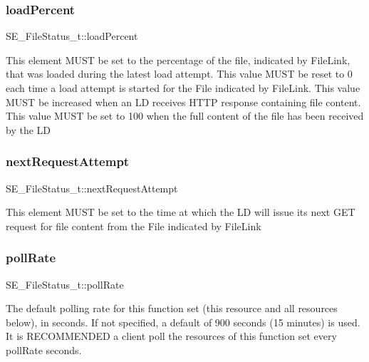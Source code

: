 \subsubsection{\texorpdfstring{load\+Percent}{loadPercent}}
{\footnotesize\ttfamily S\+E\+\_\+\+File\+Status\+\_\+t\+::load\+Percent}

This element M\+U\+ST be set to the percentage of the file, indicated by File\+Link, that was loaded during the latest load attempt. This value M\+U\+ST be reset to 0 each time a load attempt is started for the File indicated by File\+Link. This value M\+U\+ST be increased when an LD receives H\+T\+TP response containing file content. This value M\+U\+ST be set to 100 when the full content of the file has been received by the LD \mbox{\label{group__FileStatus_gace8c5876bbb1939bc810eba9c41485a8}} 
\subsubsection{\texorpdfstring{next\+Request\+Attempt}{nextRequestAttempt}}
{\footnotesize\ttfamily S\+E\+\_\+\+File\+Status\+\_\+t\+::next\+Request\+Attempt}

This element M\+U\+ST be set to the time at which the LD will issue its next G\+ET request for file content from the File indicated by File\+Link \mbox{\label{group__FileStatus_ga84d473efe80699dab7000ebf8e072f81}} 
\subsubsection{\texorpdfstring{poll\+Rate}{pollRate}}
{\footnotesize\ttfamily S\+E\+\_\+\+File\+Status\+\_\+t\+::poll\+Rate}

The default polling rate for this function set (this resource and all resources below), in seconds. If not specified, a default of 900 seconds (15 minutes) is used. It is R\+E\+C\+O\+M\+M\+E\+N\+D\+ED a client poll the resources of this function set every poll\+Rate seconds. \mbox{\label{group__FileStatus_gaac513ab0b825a0ca8dc8781afbd86fea}} 
